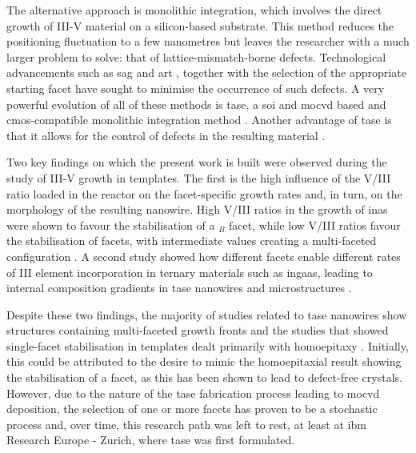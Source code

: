 The alternative approach is monolithic integration, which involves the direct growth of III-V material on a silicon-based substrate. This method reduces the positioning fluctuation to a few nanometres but leaves the researcher with a much larger problem to solve: that of lattice-mismatch-borne defects. Technological advancements such as \acf{sag} and \acf{art} \cite{Kunert2016, Fiorenza2019}, together with the selection of the appropriate starting facet \cite{Kunert2018} have sought to minimise the occurrence of such defects. A very powerful evolution of all of these methods is \acf{tase}, a \acf{soi} and \acf{mocvd} based and \acs{cmos}-compatible \cite{Svensson2023} monolithic integration method \cite{borgTASEp2018, Schmid2015}. Another advantage of \acs{tase} is that it allows for the control of defects in the resulting material \cite{Knoedler2017, Staudinger2018, Han2020}. 

Two key findings on which the present work is built were observed during the study of III-V growth in templates. The first is the high influence of the V/III ratio loaded in the reactor on the facet-specific growth rates and, in turn, on the morphology of the resulting nanowire. High V/III ratios in the growth of \acs{inas} were shown to favour the stabilisation of a \(_B\) facet, while low V/III ratios favour the stabilisation of  facets, with intermediate values creating a multi-faceted configuration \cite{Borg2015}. A second study showed how different facets enable different rates of III element incorporation in ternary materials such as \acs{ingaas}, leading to internal composition gradients in \acs{tase} nanowires and microstructures \cite{Borg2019}.

Despite these two findings, the majority of studies related to \acs{tase} nanowires show structures containing multi-faceted growth fronts \cite{Knoedler2017, Han2016, Yan2021, Scherrer2024, Xue2021, Wen2022} and the studies that showed single-facet stabilisation in templates dealt primarily with homoepitaxy \cite{Goswami2020, Brunelli2019}. Initially, this could be attributed to the desire to mimic the homoepitaxial result showing the stabilisation of a  facet, as this has been shown to lead to defect-free crystals. However, due to the nature of the \acs{tase} fabrication process leading to \acs{mocvd} deposition, the selection of one or more  facets has proven to be a stochastic process \cite{Knoedler2017} and, over time, this research path was left to rest, at least at \acs{ibm} Research Europe - Zurich, where \acs{tase} was first formulated.

